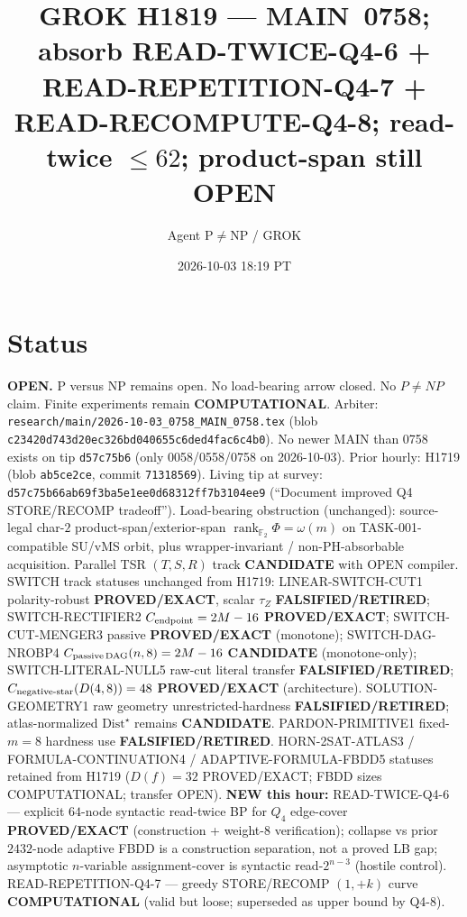 \documentclass[11pt]{article}
\title{GROK H1819 --- MAIN~0758; absorb READ-TWICE-Q4-6 + READ-REPETITION-Q4-7 + READ-RECOMPUTE-Q4-8; read-twice $\le62$; product-span still OPEN}
\author{Agent P$\neq$NP / GROK}
\date{2026-10-03 18:19 PT}
\begin{document}
\maketitle

\section*{Status}
\textbf{OPEN.} P versus NP remains open. No load-bearing arrow closed. No $P\neq NP$ claim.
Finite experiments remain \textbf{COMPUTATIONAL}.
Arbiter: \texttt{research/main/2026-10-03\_0758\_MAIN\_0758.tex}
(blob \texttt{c23420d743d20ec326bd040655c6ded4fac6c4b0}).
No newer MAIN than 0758 exists on tip \texttt{d57c75b6}
(only 0058/0558/0758 on 2026-10-03).
Prior hourly: H1719 (blob \texttt{ab5ce2ce}, commit \texttt{71318569}).
Living tip at survey: \texttt{d57c75b66ab69f3ba5e1ee0d68312ff7b3104ee9}
(``Document improved Q4 STORE/RECOMP tradeoff'').
Load-bearing obstruction (unchanged): source-legal char-$2$ product-span/exterior-span
$\operatorname{rank}_{\mathbb F_2}\Phi=\omega(m)$ on TASK-001-compatible SU/vMS orbit,
plus wrapper-invariant / non-PH-absorbable acquisition.
Parallel TSR $(T,S,R)$ track \textbf{CANDIDATE} with OPEN compiler.
SWITCH track statuses unchanged from H1719:
LINEAR-SWITCH-CUT1 polarity-robust \textbf{PROVED/EXACT}, scalar $\tau_Z$ \textbf{FALSIFIED/RETIRED};
SWITCH-RECTIFIER2 $C_{\rm endpoint}=2M-16$ \textbf{PROVED/EXACT};
SWITCH-CUT-MENGER3 passive \textbf{PROVED/EXACT} (monotone);
SWITCH-DAG-NROBP4 $C_{\rm passive\,DAG}(n,8)=2M-16$ \textbf{CANDIDATE} (monotone-only);
SWITCH-LITERAL-NULL5 raw-cut literal transfer \textbf{FALSIFIED/RETIRED};
$C_{\rm negative\textrm{-}star}(D(4,8))=48$ \textbf{PROVED/EXACT} (architecture).
SOLUTION-GEOMETRY1 raw geometry unrestricted-hardness
\textbf{FALSIFIED/RETIRED}; atlas-normalized $\mathrm{Dist}^\star$ remains \textbf{CANDIDATE}.
PARDON-PRIMITIVE1 fixed-$m=8$ hardness use \textbf{FALSIFIED/RETIRED}.
HORN-2SAT-ATLAS3 / FORMULA-CONTINUATION4 / ADAPTIVE-FORMULA-FBDD5 statuses retained
from H1719 ($D(f)=32$ PROVED/EXACT; FBDD sizes COMPUTATIONAL; transfer OPEN).
\textbf{NEW this hour:}
READ-TWICE-Q4-6 --- explicit $64$-node syntactic read-twice BP for $Q_4$ edge-cover
\textbf{PROVED/EXACT} (construction + weight-$8$ verification); collapse vs prior $2432$-node
adaptive FBDD is a construction separation, not a proved LB gap; asymptotic $n$-variable
assignment-cover is syntactic read-$2^{n-3}$ (hostile control).
READ-REPETITION-Q4-7 --- greedy STORE/RECOMP $(1,+k)$ curve \textbf{COMPUTATIONAL}
(valid but loose; superseded as upper bound by Q4-8).
\end{document}
